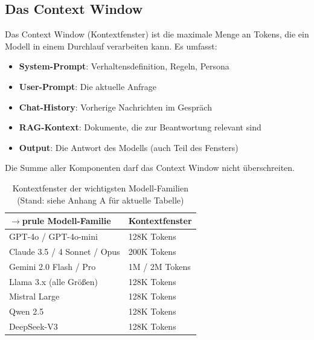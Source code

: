 
\subsection{Das Context Window}
\label{sec:context_window}

Das Context Window (Kontextfenster) ist die maximale Menge an Tokens, die ein Modell in einem Durchlauf verarbeiten kann. Es umfasst:
\begin{itemize}[leftmargin=*]
  \item \textbf{System-Prompt}: Verhaltensdefinition, Regeln, Persona
  \item \textbf{User-Prompt}: Die aktuelle Anfrage
  \item \textbf{Chat-History}: Vorherige Nachrichten im Gespräch
  \item \textbf{RAG-Kontext}: Dokumente, die zur Beantwortung relevant sind
  \item \textbf{Output}: Die Antwort des Modells (auch Teil des Fensters)
\end{itemize}

Die Summe aller Komponenten darf das Context Window nicht überschreiten.

\begin{table}[H]
\centering
\begin{tabularx}{\linewidth}{lX}
$\to$prule
\textbf{Modell-Familie} & \textbf{Kontextfenster} \\
\midrule
GPT-4o / GPT-4o-mini & 128K Tokens \\
Claude 3.5 / 4 Sonnet / Opus & 200K Tokens \\
Gemini 2.0 Flash / Pro & 1M / 2M Tokens \\
Llama 3.x (alle Größen) & 128K Tokens \\
Mistral Large & 128K Tokens \\
Qwen 2.5 & 128K Tokens \\
DeepSeek-V3 & 128K Tokens \\
\bottomrule
\end{tabularx}
\caption{Kontextfenster der wichtigsten Modell-Familien (Stand: siehe Anhang A für aktuelle Tabelle)}
\label{tab:kontextfenster}
\end{table}


